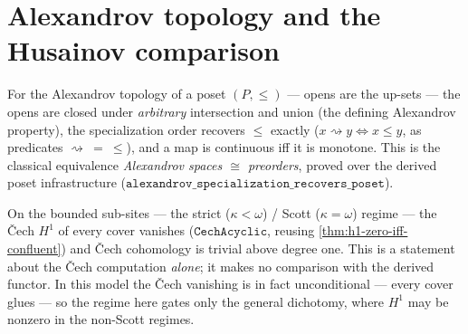 \section{Alexandrov topology and the Husainov comparison}

\begin{theorem}\label{thm:alexandrov-recovers-poset}\leanok{}
For the Alexandrov topology of a poset $(P,\le)$ --- opens are the up-sets --- the opens are
closed under \emph{arbitrary} intersection and union (the defining Alexandrov property), the
specialization order recovers $\le$ exactly ($x \rightsquigarrow y \iff x \le y$, as predicates
$\rightsquigarrow\ =\ \le$), and a map is continuous iff it is monotone. This is the classical
equivalence \emph{Alexandrov spaces $\cong$ preorders}, proved over the derived poset
infrastructure ($\texttt{alexandrov\_specialization\_recovers\_poset}$).
\end{theorem}
\begin{theorem}\label{thm:husainov-cech-acyclic}\leanok{}
On the bounded sub-sites --- the strict ($\kappa<\omega$) / Scott ($\kappa=\omega$) regime --- the
\v{C}ech $H^1$ of every cover vanishes ($\texttt{CechAcyclic}$, reusing
\cref{thm:h1-zero-iff-confluent}) and \v{C}ech cohomology is trivial above degree one. This is a
statement about the \v{C}ech computation \emph{alone}; it makes no comparison with the derived
functor. In this model the \v{C}ech vanishing is in fact unconditional --- every cover glues ---
so the regime here gates only the general dichotomy, where $H^1$ may be nonzero in the non-Scott
regimes.
\end{theorem}
